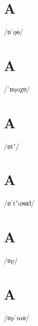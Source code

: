 \documentclass[10pt,a4paper,twoside]{book}
\begin{document}
\section*{A}

\begin{multicols}{3}
 {/ɒˈŋɵ/} {}
\end{multicols}

\section*{A}

\begin{multicols}{3}
 {/ˈɒŋuχɒ/} {}
\end{multicols}

\section*{A}

\begin{multicols}{3}
 {/ɒtʼ/} {}
\end{multicols}

\section*{A}

\begin{multicols}{3}
 {/ɒˈtʼuɴɶǁ/} {}
\end{multicols}

\section*{A}

\begin{multicols}{3}
 {/ɒp/} {}
\end{multicols}

\section*{A}

\begin{multicols}{3}
 {/ɒpˈmɵ/} {}
\end{multicols}
\end{document}
